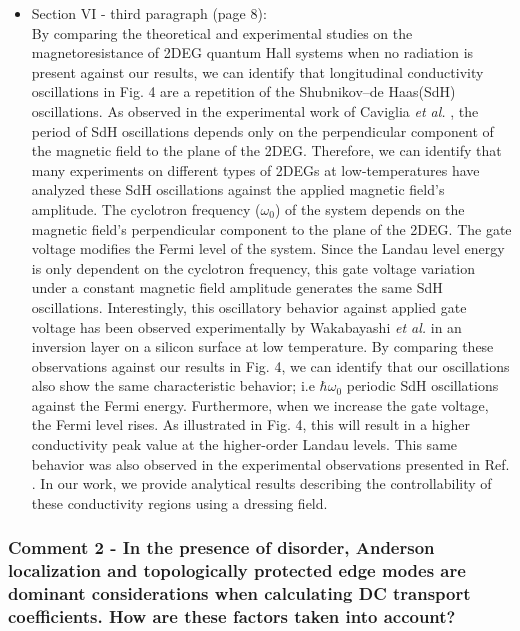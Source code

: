 \documentclass{article}
\begin{document}
\begin{itemize}
  \item Section VI - third paragraph (page 8):\\
  {\color{Red}
  By comparing the theoretical \cite{ando72,ando74_1,ando74_2,ando74_3,ando74_4,ando82,endo09} and experimental \cite{endo09,wakabayashi78,ochiai190,mancoff96,arapov02,grbic04,caviglia10} studies on the magnetoresistance of 2DEG quantum Hall systems when no radiation is present against our results, we can identify that longitudinal conductivity oscillations in Fig. 4 are a repetition of the Shubnikov–de Haas(SdH) oscillations.
  As observed in the experimental work of Caviglia \textit{et al.} \cite{caviglia10}, the period of SdH oscillations depends only on the perpendicular component of the magnetic field to the plane of the 2DEG.
  Therefore, we can identify that many experiments on different types of 2DEGs at low-temperatures \cite{endo09,ochiai190,mancoff96,arapov02,grbic04,caviglia10} have analyzed these SdH oscillations against the applied magnetic field's amplitude.
  The cyclotron frequency ($\omega_0$) of the system depends on the magnetic field's perpendicular component to the plane of the 2DEG.
  The gate voltage modifies the Fermi level of the system.
  Since the Landau level energy is only dependent on the cyclotron frequency, this gate voltage variation under a constant magnetic field amplitude generates the same SdH oscillations.
  Interestingly, this oscillatory behavior against applied gate voltage has been observed experimentally by Wakabayashi \textit{et al.} \cite{wakabayashi78} in an inversion layer on a silicon surface at low temperature.
  By comparing these observations against our results in Fig. 4, we can identify that our oscillations also show the same characteristic behavior; i.e  $\hbar\omega_0$ periodic SdH oscillations against the Fermi energy.
  Furthermore, when we increase the gate voltage, the Fermi level rises. As illustrated in Fig. 4, this will result in a higher conductivity peak value at the higher-order Landau levels. This same behavior was also observed in the experimental observations presented in Ref. \cite{wakabayashi78}.
  In our work, we provide analytical results describing the controllability of these conductivity regions using a dressing field.
  }
\end{itemize}

\subsubsection*{Comment 2 -
\color{RoyalBlue} In the presence of disorder, Anderson localization and topologically protected edge modes are dominant considerations when calculating DC transport coefficients. How are these factors taken into account?
}
\end{document}

